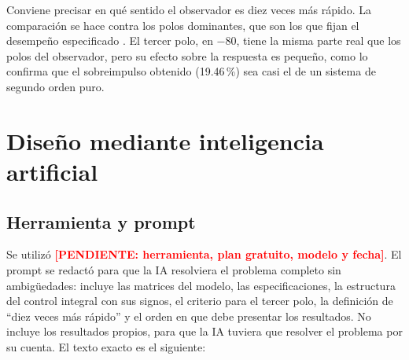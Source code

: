 \documentclass[conference]{IEEEtran}
\newcommand{\pendiente}[1]{\textcolor{red}{\textbf{[PENDIENTE: #1]}}}
\begin{document}
Conviene precisar en qué sentido el observador es diez veces más rápido. La comparación se hace contra los polos dominantes, que son los que fijan el desempeño especificado \cite{nise}. El tercer polo, en $-80$, tiene la misma parte real que los polos del observador, pero su efecto sobre la respuesta es pequeño, como lo confirma que el sobreimpulso obtenido (19.46\,\%) sea casi el de un sistema de segundo orden puro.

\section{Diseño mediante inteligencia artificial}

\subsection{Herramienta y prompt}
Se utilizó \pendiente{herramienta, plan gratuito, modelo y fecha}. El prompt se redactó para que la IA resolviera el problema completo sin ambigüedades: incluye las matrices del modelo, las especificaciones, la estructura del control integral con sus signos, el criterio para el tercer polo, la definición de ``diez veces más rápido'' y el orden en que debe presentar los resultados. No incluye los resultados propios, para que la IA tuviera que resolver el problema por su cuenta. El texto exacto es el siguiente:
\end{document}

